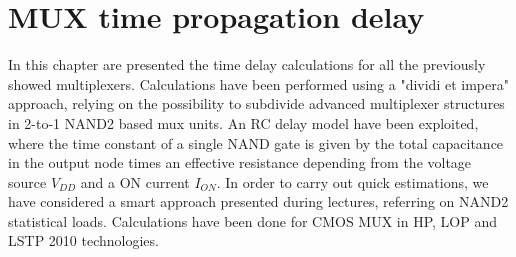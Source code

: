 \chapter{MUX time propagation delay }
In this chapter are presented the time delay calculations for all the previously showed multiplexers. Calculations have been performed using a "dividi et impera" approach, relying on the possibility to subdivide advanced multiplexer structures in  2-to-1 NAND2 based mux units. An RC delay model have been exploited, where the time constant of a single NAND gate is given by the total capacitance in the output node  times an effective resistance depending from the voltage source $V_{DD}$ and a ON current $I_{ON}$. In order to carry out quick estimations, we have considered a smart approach presented during lectures, referring on NAND2 statistical loads. Calculations have been done for CMOS MUX in HP, LOP and LSTP 2010 technologies.	


